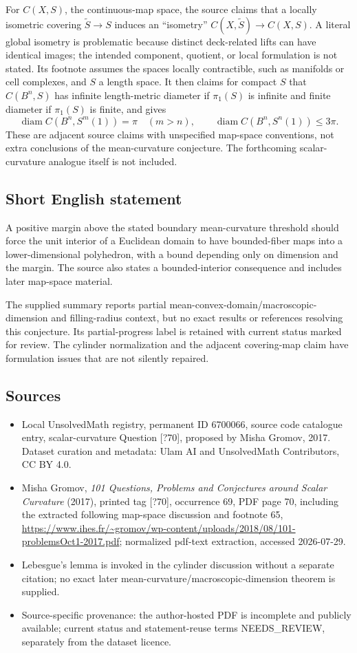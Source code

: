 \documentclass[11pt]{article}
\begin{document}
For $C(X,S)$, the continuous-map space, the source claims that a locally isometric covering $\widetilde S\to S$ induces an ``isometry'' $C(X,\widetilde S)\to C(X,S)$. A literal global isometry is problematic because distinct deck-related lifts can have identical images; the intended component, quotient, or local formulation is not stated. Its footnote assumes the spaces locally contractible, such as manifolds or cell complexes, and $S$ a length space. It then claims for compact $S$ that $C(B^n,S)$ has infinite length-metric diameter if $\pi_1(S)$ is infinite and finite diameter if $\pi_1(S)$ is finite, and gives
\[
 \operatorname{diam}C(B^n,S^m(1))=\pi\quad(m>n),
 \qquad
 \operatorname{diam}C(B^n,S^n(1))\le3\pi.
\]
These are adjacent source claims with unspecified map-space conventions, not extra conclusions of the mean-curvature conjecture. The forthcoming scalar-curvature analogue itself is not included.
\subsection{Short English statement}
A positive margin above the stated boundary mean-curvature threshold should force the unit interior of a Euclidean domain to have bounded-fiber maps into a lower-dimensional polyhedron, with a bound depending only on dimension and the margin. The source also states a bounded-interior consequence and includes later map-space material.

The supplied summary reports partial mean-convex-domain/macroscopic-dimension and filling-radius context, but no exact results or references resolving this conjecture. Its partial-progress label is retained with current status marked for review. The cylinder normalization and the adjacent covering-map claim have formulation issues that are not silently repaired.
\subsection{Sources}
\begin{itemize}
\item Local UnsolvedMath registry, permanent ID 6700066, source code catalogue entry, scalar-curvature Question [?70], proposed by Misha Gromov, 2017. Dataset curation and metadata: Ulam AI and UnsolvedMath Contributors, CC BY 4.0.
\item Misha Gromov, \emph{101 Questions, Problems and Conjectures around Scalar Curvature} (2017), printed tag [?70], occurrence 69, PDF page 70, including the extracted following map-space discussion and footnote 65, \url{https://www.ihes.fr/~gromov/wp-content/uploads/2018/08/101-problemsOct1-2017.pdf}; normalized pdf-text extraction, accessed 2026-07-29.
\item Lebesgue's lemma is invoked in the cylinder discussion without a separate citation; no exact later mean-curvature/macroscopic-dimension theorem is supplied.
\item Source-specific provenance: the author-hosted PDF is incomplete and publicly available; current status and statement-reuse terms NEEDS\_REVIEW, separately from the dataset licence.
\end{itemize}
\end{document}
